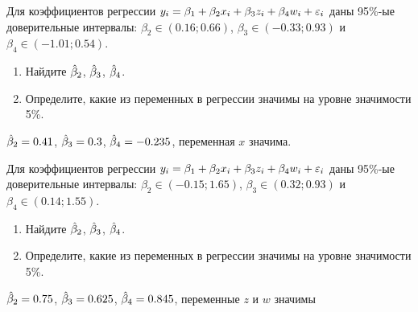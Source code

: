 \begin{problem} %
Для коэффициентов регрессии $y_i = \beta_1 + \beta_2 x_i + \beta_3 z_i  + \beta_4 w_i + \varepsilon_i$ даны 95\%-ые
доверительные интервалы: $\beta_2 \in (0.16;0.66)$, $\beta_3 \in (-0.33;0.93)$ и $\beta_4 \in (-1.01; 0.54)$.

\begin{enumerate}
\item Найдите $\hat{\beta}_2$, $\hat{\beta}_3$, $\hat{\beta}_4$.
\item Определите, какие из переменных в регрессии значимы на уровне значимости 5\%.
\end{enumerate}


\begin{sol}
$\hat{\beta}_2=0.41$, $\hat{\beta}_3=0.3$, $\hat{\beta}_4= -0.235$, переменная $x$ значима.
\end{sol}
\end{problem}



\begin{problem} %
Для коэффициентов регрессии $y_i = \beta_1 + \beta_2 x_i + \beta_3 z_i  + \beta_4 w_i + \varepsilon_i$ даны 95\%-ые
доверительные интервалы: $\beta_2 \in (-0.15;1.65)$, $\beta_3 \in (0.32;0.93)$ и $\beta_4 \in (0.14; 1.55)$.

\begin{enumerate}
\item Найдите $\hat{\beta}_2$, $\hat{\beta}_3$, $\hat{\beta}_4$.
\item Определите, какие из переменных в регрессии значимы на уровне значимости 5\%.
\end{enumerate}


\begin{sol}
$\hat{\beta}_2=0.75$, $\hat{\beta}_3=0.625$, $\hat{\beta}_4= 0.845$, переменные $z$ и $w$ значимы
\end{sol}
\end{problem}


